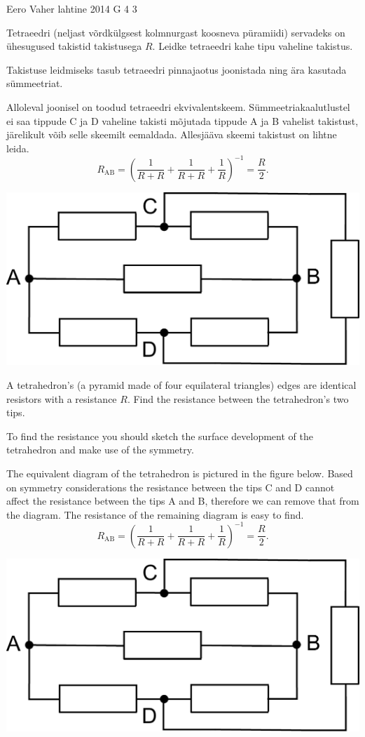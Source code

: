 {Eero Vaher} %
{lahtine} %
{2014} %
{G 4} %
{3} %
{
\ifStatement
Tetraeedri (neljast võrdkülgsest kolmnurgast koosneva püramiidi) servadeks on ühesugused takistid takistusega $R$. Leidke tetraeedri kahe tipu vaheline takistus.
\fi


\ifHint
Takistuse leidmiseks tasub tetraeedri pinnajaotus joonistada ning ära kasutada sümmeetriat.
\fi


\ifSolution
Alloleval joonisel on toodud tetraeedri ekvivalentskeem. Sümmeetriakaalutlustel ei saa tippude C ja D vaheline takisti mõjutada tippude A ja B vahelist takistust, järelikult võib selle skeemilt eemaldada. Allesjääva skeemi takistust on lihtne leida.
\[R_\text{AB}=\left(\frac{1}{R+R}+\frac{1}{R+R}+\frac{1}{R}\right)^{-1}=\frac{R}{2}.\]
\begin{center}
\includegraphics[width=0.6\linewidth]{2014-lahg-04-skeem}
\end{center}
\fi


\ifEngStatement
A tetrahedron’s (a pyramid made of four equilateral triangles) edges are identical resistors with a resistance $R$. Find the resistance between the tetrahedron’s two tips.
\fi


\ifEngHint
To find the resistance you should sketch the surface development of the tetrahedron and make use of the symmetry.
\fi


\ifEngSolution
The equivalent diagram of the tetrahedron is pictured in the figure below. Based on symmetry considerations the resistance between the tips C and D cannot affect the resistance between the tips A and B, therefore we can remove that from the diagram. The resistance of the remaining diagram is easy to find.
\[R_\text{AB}=\left(\frac{1}{R+R}+\frac{1}{R+R}+\frac{1}{R}\right)^{-1}=\frac{R}{2}.\]
\begin{center}
\includegraphics[width=0.6\linewidth]{2014-lahg-04-skeem}
\end{center}
\fi
}
